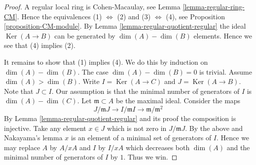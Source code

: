 \documentclass[10pt,a4paper]{amsart}
\theoremstyle{plain}
\theoremstyle{definition}
\theoremstyle{remark}
\numberwithin{equation}{subsection}
\def\Ker{\mathop{\mathrm{Ker}}}
\begin{document}
\begin{proof}
A regular local ring is Cohen-Macaulay, see Lemma \ref{lemma-regular-ring-CM}.
Hence the equivalences (1) $\Leftrightarrow$ (2) and
(3) $\Leftrightarrow$ (4), see Proposition \ref{proposition-CM-module}.
By Lemma \ref{lemma-regular-quotient-regular}
the ideal $\Ker(A \to B)$ can be generated
by $\dim(A) - \dim(B)$ elements.
Hence we see that (4) implies (2).

\medskip\noindent
It remains to show that (1) implies (4). We do this by induction on
$\dim(A) - \dim(B)$. The case $\dim(A) - \dim(B) = 0$ is trivial.
Assume $\dim(A) > \dim (B)$.
Write $I = \Ker(A \to C)$ and $J = \Ker(A \to B)$.
Note that $J \subset I$. Our assumption is that the minimal number
of generators of $I$ is $\dim(A) - \dim(C)$.
Let $\mathfrak m \subset A$ be the maximal
ideal. Consider the maps
$$
J/ \mathfrak m J \to  I / \mathfrak m I \to \mathfrak m /\mathfrak m^2
$$
By Lemma \ref{lemma-regular-quotient-regular} and its proof the
composition is injective. Take any element $x \in J$ which is
not zero in $J /\mathfrak mJ$. By the above and Nakayama's lemma
$x$ is an element of a minimal set of generators of $I$.
Hence we may replace $A$ by $A/xA$ and $I$ by $I/xA$ which
decreases both $\dim(A)$ and the minimal number of generators of $I$
by $1$. Thus we win.
\end{proof}
\end{document}
